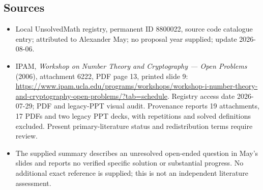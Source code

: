 \documentclass[11pt]{article}
\begin{document}
\subsection{Sources}
\begin{itemize}
\item Local UnsolvedMath registry, permanent ID 8800022, source code catalogue entry; attributed to Alexander May; no proposal year supplied; update 2026-08-06.
\item IPAM, \emph{Workshop on Number Theory and Cryptography --- Open Problems} (2006), attachment 6222, PDF page 13, printed slide 9: \url{https://www.ipam.ucla.edu/programs/workshops/workshop-i-number-theory-and-cryptography-open-problems/?tab=schedule}. Registry access date 2026-07-29; PDF and legacy-PPT visual audit. Provenance reports 19 attachments, 17 PDFs and two legacy PPT decks, with repetitions and solved definitions excluded. Present primary-literature status and redistribution terms require review.
\item The supplied summary describes an unresolved open-ended question in May's slides and reports no verified specific solution or substantial progress. No additional exact reference is supplied; this is not an independent literature assessment.
\end{itemize}
\end{document}
